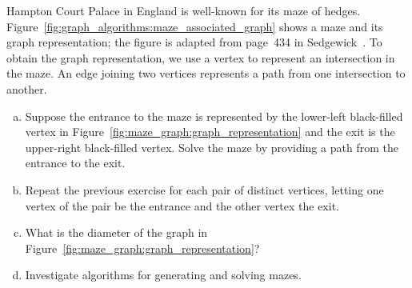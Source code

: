 \begin{problem}
\item Hampton Court Palace in
  England is well-known for its maze of
  hedges. Figure~\ref{fig:graph_algorithms:maze_associated_graph}
  shows a maze and its graph representation; the figure is adapted
  from page~434 in
  Sedgewick~\cite{Sedgewick1990}. To obtain
  the graph representation, we use a vertex to represent an
  intersection in the maze. An edge joining two vertices
  represents a path from one intersection to another.
  \begin{enumerate}[(a)]
  \item Suppose the entrance to the maze is represented by the
    lower-left black-filled vertex in
    Figure~\ref{fig:maze_graph:graph_representation} and the exit is
    the upper-right black-filled vertex. Solve the maze by providing a
    path from the entrance to the exit.

  \item Repeat the previous exercise for each pair of distinct
    vertices, letting one vertex of the pair be the entrance and the
    other vertex the exit.

  \item What is the diameter of the graph in
    Figure~\ref{fig:maze_graph:graph_representation}?

  \item Investigate algorithms for generating and solving mazes.
  \end{enumerate}


\end{problem}
